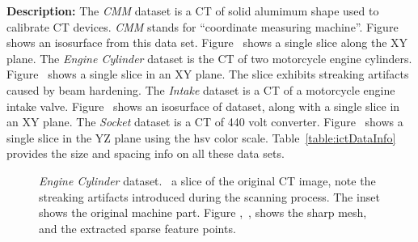 \textbf{Description:} 
The \emph{CMM} dataset is a CT 
of solid alumimum shape used to calibrate CT devices.
\emph{CMM} stands for ``coordinate measuring machine''.
Figure~ shows an isosurface from this data set.
Figure~ shows a single slice along the XY plane. 
The \textit{Engine Cylinder} dataset is the CT 
of two motorcycle engine cylinders.
Figure~ shows a single slice
in an XY plane.
The slice exhibits streaking artifacts caused by beam hardening.
The \emph{Intake} dataset is a CT of a motorcycle engine intake valve.
Figure~ shows an isosurface of dataset, 
along with a single slice in an XY plane.
The \emph{Socket} dataset is a CT of 440 volt converter.
Figure~ shows a single
slice in the YZ plane using the hsv color scale. 
Table~\ref{table:ictDataInfo} provides the size and spacing
info on all these data sets.

\begin{figure}[htb]
    \centering
    \caption{\textit{Engine Cylinder} dataset.~\protect{} a slice of the original CT image, note the streaking artifacts introduced during the scanning process.
    The inset shows the original machine part. Figure \protect{},~\protect{}, shows the sharp mesh, and the extracted sparse feature points.}
    \label{fig:setA.crop1}
\end{figure}

